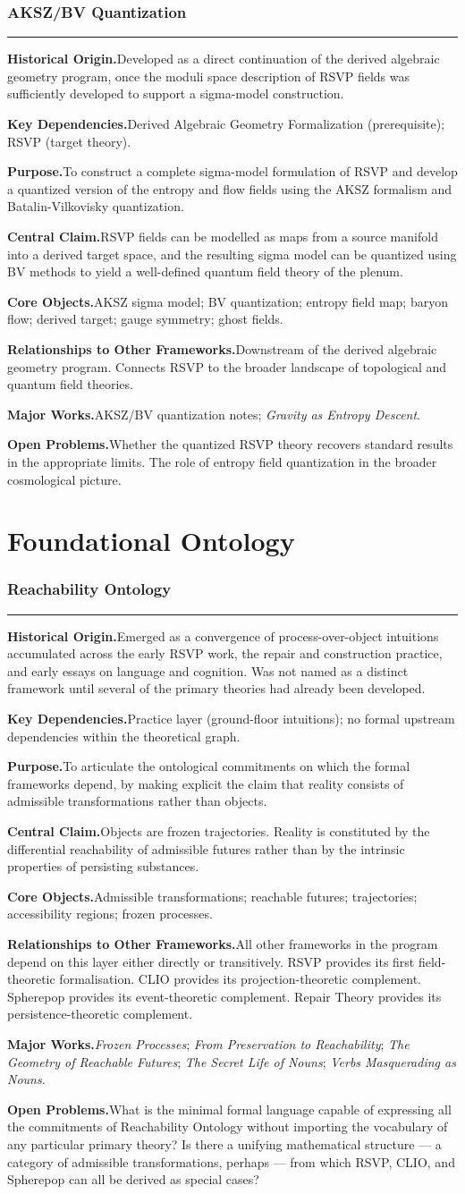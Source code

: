 \documentclass[12pt, twoside]{article}
\newcommand{\frameworkhead}[5]{  \subsubsection{#1}
  \noindent\textcolor{#2}{\rule{\linewidth}{0.8pt}}
  \smallskip

  \noindent\textbf{Historical Origin.}\quad #3

  \noindent\textbf{Key Dependencies.}\quad #4

  \noindent\textbf{Purpose.}\quad #5
}
\newcommand{\frameworkbody}[5]{  \noindent\textbf{Central Claim.}\quad #1

  \noindent\textbf{Core Objects.}\quad #2

  \noindent\textbf{Relationships to Other Frameworks.}\quad #3

  \noindent\textbf{Major Works.}\quad #4

  \noindent\textbf{Open Problems.}\quad #5
  \medskip
}
\begin{document}
\frameworkhead{AKSZ/BV Quantization}{formalismgray}{Developed as a direct continuation of the derived algebraic geometry
program, once the moduli space description of RSVP fields was sufficiently
developed to support a sigma-model construction.}{Derived Algebraic Geometry Formalization (prerequisite); RSVP (target
theory).}{To construct a complete sigma-model formulation of RSVP and develop a
quantized version of the entropy and flow fields using the AKSZ formalism
and Batalin-Vilkovisky quantization.}
\frameworkbody{RSVP fields can be modelled as maps from a source manifold into a derived
target space, and the resulting sigma model can be quantized using BV methods
to yield a well-defined quantum field theory of the plenum.}{AKSZ sigma model; BV quantization; entropy field map; baryon flow; derived
target; gauge symmetry; ghost fields.}{Downstream of the derived algebraic geometry program. Connects RSVP to the
broader landscape of topological and quantum field theories.}{AKSZ/BV quantization notes; \emph{Gravity as Entropy Descent}.}{Whether the quantized RSVP theory recovers standard results in the
appropriate limits. The role of entropy field quantization in the broader
cosmological picture.}

\section{Foundational Ontology}

\frameworkhead{Reachability Ontology}{rsvpblue}{Emerged as a convergence of process-over-object intuitions accumulated
across the early RSVP work, the repair and construction practice, and
early essays on language and cognition. Was not named as a distinct
framework until several of the primary theories had already been developed.}{Practice layer (ground-floor intuitions); no formal upstream dependencies
within the theoretical graph.}{To articulate the ontological commitments on which the formal frameworks
depend, by making explicit the claim that reality consists of admissible
transformations rather than objects.}
\frameworkbody{Objects are frozen trajectories. Reality is constituted by the differential
reachability of admissible futures rather than by the intrinsic properties of
persisting substances.}{Admissible transformations; reachable futures; trajectories; accessibility
regions; frozen processes.}{All other frameworks in the program depend on this layer either directly or
transitively. RSVP provides its first field-theoretic formalisation. CLIO
provides its projection-theoretic complement. Spherepop provides its
event-theoretic complement. Repair Theory provides its persistence-theoretic
complement.}{\emph{Frozen Processes}; \emph{From Preservation to Reachability}; \emph{The
Geometry of Reachable Futures}; \emph{The Secret Life of Nouns}; \emph{Verbs
Masquerading as Nouns}.}{What is the minimal formal language capable of expressing all the
commitments of Reachability Ontology without importing the vocabulary of any
particular primary theory? Is there a unifying mathematical structure — a
category of admissible transformations, perhaps — from which RSVP, CLIO, and
Spherepop can all be derived as special cases?}
\end{document}
